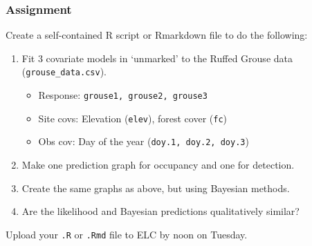 \documentclass[color=usenames,dvipsnames]{beamer}\usepackage[]{graphicx}\usepackage[]{xcolor}
\begin{document}
\begin{frame}
  \frametitle{Assignment}
  \footnotesize
  Create a self-contained R script or Rmarkdown file
  to do the following:
  \vfill
  \begin{enumerate}
    \footnotesize
    \item Fit 3 covariate models in `unmarked' to the Ruffed Grouse data ({\tt grouse\_data.csv}). 
      \begin{itemize}
        \footnotesize
        \item Response: \texttt{grouse1, grouse2, grouse3}
        \item Site covs: Elevation (\texttt{elev}), forest cover ({\tt fc})
        \item Obs cov: Day of the year (\texttt{doy.1, doy.2, doy.3})
      \end{itemize}
    \item Make one prediction graph for occupancy and one for detection. 
    \item Create the same graphs as above, but using Bayesian methods.
    \item Are the likelihood and Bayesian predictions qualitatively similar?
    \end{enumerate}
    \vfill
    Upload your {\tt .R} or {\tt .Rmd} file to ELC by noon on Tuesday. 
\end{frame}
\end{document}
